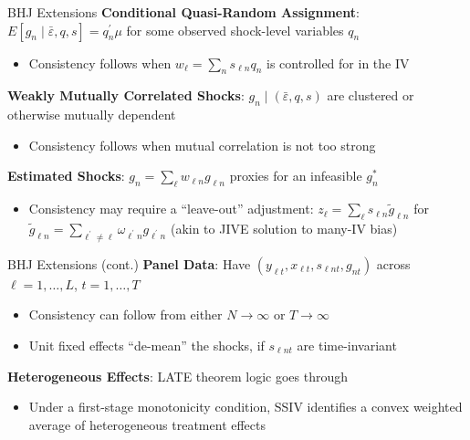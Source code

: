 \documentclass[t]{beamer}
\begin{document}
\begin{frame}{BHJ Extensions}
\vspace{-0.3cm}
\textbf{Conditional Quasi-Random Assignment}: $E[g_n\mid \bar{\varepsilon},q,s]=q_n^\prime \mu$ for some observed shock-level variables $q_n$\smallskip
\begin{itemize}
\item Consistency follows when $w_\ell = \sum_n s_{\ell n} q_n$ is controlled for in the IV
\end{itemize}\medskip\pause
\textbf{Weakly Mutually Correlated Shocks}: $g_n\mid (\bar{\varepsilon},q,s)$ are clustered or otherwise mutually dependent \smallskip
\begin{itemize}
\item Consistency follows when mutual correlation is not too strong
\end{itemize}\medskip\pause
 \textbf{Estimated Shocks}: $g_n=\sum_\ell w_{\ell n}g_{\ell n}$ proxies for an infeasible $g_n^*$\smallskip
\begin{itemize}
\item Consistency may require a ``leave-out'' adjustment: $z_\ell=\sum_\ell s_{\ell n}\tilde{g}_{\ell n}$ for $\tilde{g}_{\ell n}=\sum_{\ell^\prime\neq \ell} \omega_{\ell^\prime n}g_{\ell^\prime n}$ (akin to JIVE solution to many-IV bias) 
\end{itemize}

\end{frame}


\begin{frame}{BHJ Extensions (cont.)}
\vspace{-0.3cm}
\textbf{Panel Data}: Have $(y_{\ell t},x_{\ell t},s_{\ell n t},g_{n t})$ across $\ell=1,\dots,L$, $t=1,\dots,T$\smallskip
\begin{itemize}
\item Consistency can follow from either $N\rightarrow\infty$ or $T\rightarrow\infty$\smallskip
\item Unit fixed effects ``de-mean'' the shocks, if $s_{\ell n t}$ are time-invariant%
\end{itemize}\medskip\pause
\textbf{Heterogeneous Effects}: LATE theorem logic goes through
\begin{itemize}
\item Under a first-stage monotonicity condition, SSIV identifies a convex weighted average of heterogeneous treatment effects
\end{itemize}

\end{frame}
\end{document}
